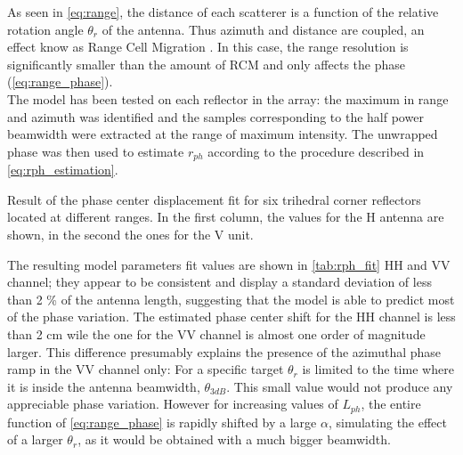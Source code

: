 As seen in \autoref{eq:range}, the distance of each scatterer is a function of the relative rotation angle $\theta_r$ of the antenna. Thus azimuth and distance are coupled, an effect know as Range Cell Migration . In this case, the range resolution is significantly smaller than the amount of RCM and only affects the phase (\autoref{eq:range_phase}).\\
The model has been tested on each reflector in the array: the maximum in range and azimuth was identified and the samples corresponding to the half power beamwidth were extracted at the range of maximum intensity. The unwrapped phase was then used to estimate $r_{ph}$ according to the procedure described in \autoref{eq:rph_estimation}.



\begin{table}[ht]
	\centering
	\caption{Result of the phase center displacement fit for six trihedral corner reflectors located at different ranges. In the first column, the values for the H antenna are shown, in the second the ones for the V unit.}
	\label{tab:rph_fit}
\end{table}
The resulting model parameters fit values  are shown in \autoref{tab:rph_fit} HH and VV channel; they appear to be consistent and display a standard deviation of less than 2 \% of the antenna length, suggesting that the model is able to predict most of the phase variation. The estimated phase center shift for the HH channel is less than 2 cm wile the one for the VV channel is almost one order of magnitude larger. This difference presumably explains the presence of the azimuthal phase ramp in the VV channel only:
For a specific target  $\theta_r$ is limited to the time where it is inside the antenna beamwidth, $\theta_{3dB}$. This small value would not produce any appreciable phase variation. However for increasing values of $L_{ph}$, the entire function of \autoref{eq:range_phase} is rapidly shifted  by a large $\alpha$, simulating the effect of a larger $\theta_r$, as it would be obtained with a much bigger beamwidth.\\
